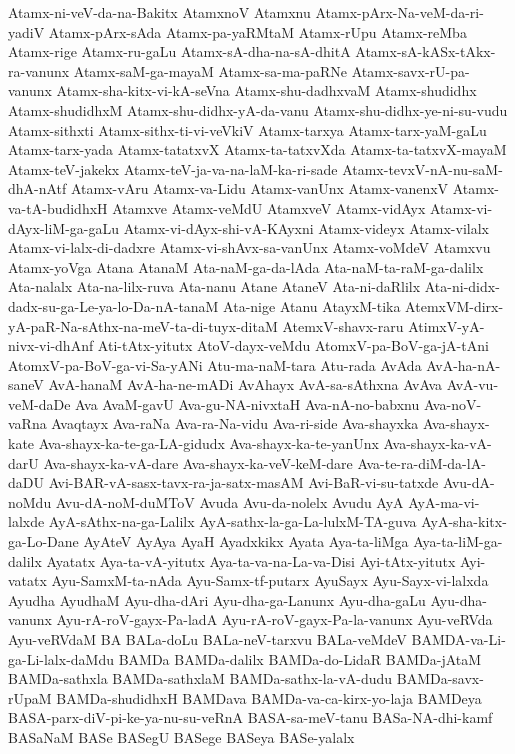{Atamx-ni-veV-da-na-Bakitx
AtamxnoV
Atamxnu
Atamx-pArx-Na-veM-da-ri-yadiV
Atamx-pArx-sAda
Atamx-pa-yaRMtaM
Atamx-rUpu
Atamx-reMba
Atamx-rige
Atamx-ru-gaLu
Atamx-sA-dha-na-sA-dhitA
Atamx-sA-kASx-tAkx-ra-vanunx
Atamx-saM-ga-mayaM
Atamx-sa-ma-paRNe
Atamx-savx-rU-pa-vanunx
Atamx-sha-kitx-vi-kA-seVna
Atamx-shu-dadhxvaM
Atamx-shudidhx
Atamx-shudidhxM
Atamx-shu-didhx-yA-da-vanu
Atamx-shu-didhx-ye-ni-su-vudu
Atamx-sithxti
Atamx-sithx-ti-vi-veVkiV
Atamx-tarxya
Atamx-tarx-yaM-gaLu
Atamx-tarx-yada
Atamx-tatatxvX
Atamx-ta-tatxvXda
Atamx-ta-tatxvX-mayaM
Atamx-teV-jakekx
Atamx-teV-ja-va-na-laM-ka-ri-sade
Atamx-tevxV-nA-nu-saM-dhA-nAtf
Atamx-vAru
Atamx-va-Lidu
Atamx-vanUnx
Atamx-vanenxV
Atamx-va-tA-budidhxH
Atamxve
Atamx-veMdU
AtamxveV
Atamx-vidAyx
Atamx-vi-dAyx-liM-ga-gaLu
Atamx-vi-dAyx-shi-vA-KAyxni
Atamx-videyx
Atamx-vilalx
Atamx-vi-lalx-di-dadxre
Atamx-vi-shAvx-sa-vanUnx
Atamx-voMdeV
Atamxvu
Atamx-yoVga
Atana
AtanaM
Ata-naM-ga-da-lAda
Ata-naM-ta-raM-ga-dalilx
Ata-nalalx
Ata-na-lilx-ruva
Ata-nanu
Atane
AtaneV
Ata-ni-daRlilx
Ata-ni-didx-dadx-su-ga-Le-ya-lo-Da-nA-tanaM
Ata-nige
Atanu
AtayxM-tika
AtemxVM-dirx-yA-paR-Na-sAthx-na-meV-ta-di-tuyx-ditaM
AtemxV-shavx-raru
AtimxV-yA-nivx-vi-dhAnf
Ati-tAtx-yitutx
AtoV-dayx-veMdu
AtomxV-pa-BoV-ga-jA-tAni
AtomxV-pa-BoV-ga-vi-Sa-yANi
Atu-ma-naM-tara
Atu-rada
AvAda
AvA-ha-nA-saneV
AvA-hanaM
AvA-ha-ne-mADi
AvAhayx
AvA-sa-sAthxna
AvAva
AvA-vu-veM-daDe
Ava
AvaM-gavU
Ava-gu-NA-nivxtaH
Ava-nA-no-babxnu
Ava-noV-vaRna
Avaqtayx
Ava-raNa
Ava-ra-Na-vidu
Ava-ri-side
Ava-shayxka
Ava-shayx-kate
Ava-shayx-ka-te-ga-LA-gidudx
Ava-shayx-ka-te-yanUnx
Ava-shayx-ka-vA-darU
Ava-shayx-ka-vA-dare
Ava-shayx-ka-veV-keM-dare
Ava-te-ra-diM-da-lA-daDU
Avi-BAR-vA-sasx-tavx-ra-ja-satx-masAM
Avi-BaR-vi-su-tatxde
Avu-dA-noMdu
Avu-dA-noM-duMToV
Avuda
Avu-da-nolelx
Avudu
AyA
AyA-ma-vi-lalxde
AyA-sAthx-na-ga-Lalilx
AyA-sathx-la-ga-La-lulxM-TA-guva
AyA-sha-kitx-ga-Lo-Dane
AyAteV
AyAya
AyaH
Ayadxkikx
Ayata
Aya-ta-liMga
Aya-ta-liM-ga-dalilx
Ayatatx
Aya-ta-vA-yitutx
Aya-ta-va-na-La-va-Disi
Ayi-tAtx-yitutx
Ayi-vatatx
Ayu-SamxM-ta-nAda
Ayu-Samx-tf-putarx
AyuSayx
Ayu-Sayx-vi-lalxda
Ayudha
AyudhaM
Ayu-dha-dAri
Ayu-dha-ga-Lanunx
Ayu-dha-gaLu
Ayu-dha-vanunx
Ayu-rA-roV-gayx-Pa-ladA
Ayu-rA-roV-gayx-Pa-la-vanunx
Ayu-veRVda
Ayu-veRVdaM
BA
BALa-doLu
BALa-neV-tarxvu
BALa-veMdeV
BAMDA-va-Li-ga-Li-lalx-daMdu
BAMDa
BAMDa-dalilx
BAMDa-do-LidaR
BAMDa-jAtaM
BAMDa-sathxla
BAMDa-sathxlaM
BAMDa-sathx-la-vA-dudu
BAMDa-savx-rUpaM
BAMDa-shudidhxH
BAMDava
BAMDa-va-ca-kirx-yo-laja
BAMDeya
BASA-parx-diV-pi-ke-ya-nu-su-veRnA
BASA-sa-meV-tanu
BASa-NA-dhi-kamf
BASaNaM
BASe
BASegU
BASege
BASeya
BASe-yalalx
}
